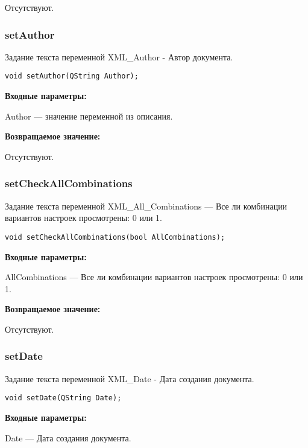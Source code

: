 \documentclass[a4paper,12pt]{article}
\begin{document}
Отсутствуют.


\subsubsection{setAuthor}\label{setAuthor}

Задание текста переменной XML\_Author - Автор документа.


\begin{lstlisting}[label=code_syntax_setAuthor,caption=Синтаксис]
void setAuthor(QString Author);
\end{lstlisting}

\textbf{Входные параметры:}

Author --- значение переменной из описания.

\textbf{Возвращаемое значение:}

Отсутствуют.


\subsubsection{setCheckAllCombinations}\label{setCheckAllCombinations}

Задание текста переменной  XML\_All\_Combinations --- Все ли комбинации вариантов настроек просмотрены: 0 или 1.


\begin{lstlisting}[label=code_syntax_setCheckAllCombinations,caption=Синтаксис]
void setCheckAllCombinations(bool AllCombinations);
\end{lstlisting}

\textbf{Входные параметры:}

AllCombinations --- Все ли комбинации вариантов настроек просмотрены: 0 или 1.

\textbf{Возвращаемое значение:}

Отсутствуют.


\subsubsection{setDate}\label{setDate}

Задание текста переменной  XML\_Date - Дата создания документа.


\begin{lstlisting}[label=code_syntax_setDate,caption=Синтаксис]
void setDate(QString Date);
\end{lstlisting}

\textbf{Входные параметры:}

Date --- Дата создания документа.
\end{document}

